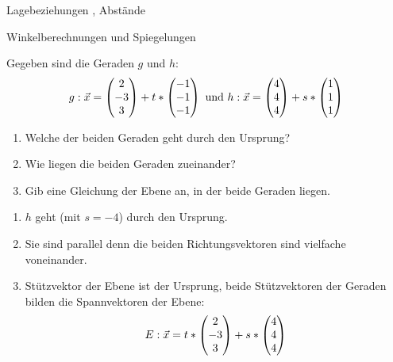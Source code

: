 

\usepackage{xfrac}


\begin{inhalt}
	\item Lagebeziehungen , Abstände 
	\item Winkelberechnungen und Spiegelungen 
\end{inhalt}



 Gegeben sind die Geraden $g$ und $h$:
\begin{equation*}
	g:\vec x=\begin{pmatrix} 2\\-3\\3 \end{pmatrix}+t*\begin{pmatrix} -1\\-1\\-1 \end{pmatrix} \text{ und } h:\vec x=\begin{pmatrix} 4\\4\\4 \end{pmatrix}+s*\begin{pmatrix} 1\\1\\1 \end{pmatrix}
\end{equation*}
\begin{enumerate}
	\item Welche der beiden Geraden geht durch den Ursprung?
	\item Wie liegen die beiden Geraden zueinander?
	\item Gib eine Gleichung der Ebene an, in der beide Geraden liegen.
\end{enumerate}
\begin{lsg}{}
	\begin{enumerate}
		\item $h$ geht (mit $s=-4$) durch den Ursprung.
		\item Sie sind parallel denn die beiden Richtungsvektoren sind vielfache voneinander.
		\item Stützvektor der Ebene ist der Ursprung, beide Stützvektoren der Geraden bilden die Spannvektoren der Ebene:
		\begin{equation*}
			E: \vec x=t*\begin{pmatrix} 2\\-3\\3 \end{pmatrix}+s*\begin{pmatrix} 4\\4\\4 \end{pmatrix}
		\end{equation*}
	\end{enumerate}
\end{lsg}


